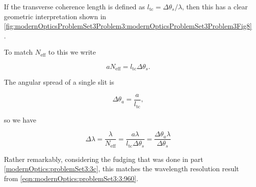 {%
%
%

If the transverse coherence length is defined as $l_{\mathrm{tc}} = \Delta \theta_s/\lambda$, then this has a clear geometric interpretation shown in \cref{fig:modernOpticsProblemSet3Problem3:modernOpticsProblemSet3Problem3Fig8}.


To match $N_{\mathrm{eff}}$ to this we write

\begin{dmath}\label{eqn:modernOptics:problemSet3:3:1000}
a N_{\mathrm{eff}} = l_{\mathrm{tc}} \Delta \theta_s.
\end{dmath}

The angular spread of a single slit is 

\begin{dmath}\label{eqn:modernOptics:problemSet3:3:1020}
\Delta \theta_a = \frac{a}{l_{\mathrm{tc}}},
\end{dmath}

so we have 

\begin{dmath}\label{eqn:modernOptics:problemSet3:3:1040}
\Delta \lambda 
= \frac{\lambda}{ N_{\mathrm{eff}} }
= \frac{a \lambda}{ 
l_{\mathrm{tc}} \Delta \theta_s
}
= 
\frac{\Delta \theta_a \lambda}{ 
\Delta \theta_s
}
\end{dmath}

Rather remarkably, considering the fudging that was done in part \ref{modernOptics:problemSet3:3c}, this matches the wavelength resolution result from \ref{eqn:modernOptics:problemSet3:3:960}.

} %
